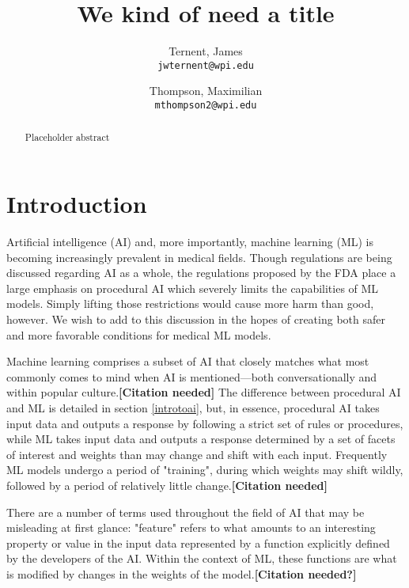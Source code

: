 \documentclass[]{article}
\title{We kind of need a title}
\author{
  Ternent, James\\
  \texttt{jwternent@wpi.edu}
  \and
  Thompson, Maximilian\\
  \texttt{mthompson2@wpi.edu}
}
\begin{document}
	
	\maketitle
	
	\begin{abstract}
		Placeholder abstract
	\end{abstract}
	
	\section{Introduction}
	
		Artificial intelligence (AI) and, more importantly, machine learning (ML) is becoming increasingly prevalent in medical fields. Though regulations are being discussed regarding AI as a whole, the regulations proposed by the FDA\cite{fdaregproposal} place a large emphasis on procedural AI which severely limits the capabilities of ML models. Simply lifting those restrictions would cause more harm than good, however. We wish to add to this discussion in the hopes of creating both safer and more favorable conditions for medical ML models.

		Machine learning comprises a subset of AI that closely matches what most commonly comes to mind when AI is mentioned---both conversationally and within popular culture.\textbf{[Citation needed]} The difference between procedural AI and ML is detailed in section \ref{introtoai}, but, in essence, procedural AI takes input data and outputs a response by following a strict set of rules or procedures, while ML takes input data and outputs a response determined by a set of facets of interest and weights than may change and shift with each input. Frequently ML models undergo a period of "training", during which weights may shift wildly, followed by a period of relatively little change.\textbf{[Citation needed]}

		There are a number of terms used throughout the field of AI that may be misleading at first glance: "feature" refers to what amounts to an interesting property or value in the input data represented by a function explicitly defined by the developers of the AI. Within the context of ML, these functions are what is modified by changes in the weights of the model.\textbf{[Citation needed?]}
\end{document}
